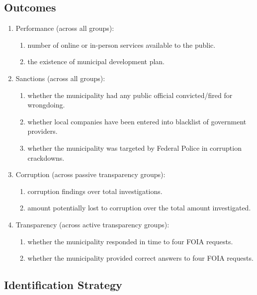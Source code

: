 \documentclass[]{article}
\begin{document}
\hypertarget{outcomes}{%
\subsection{Outcomes}\label{outcomes}}

\begin{enumerate}
\item
  Performance (across all groups):

  \begin{enumerate}
  \item
    number of online or in-person services available to the public.
  \item
    the existence of municipal development plan.
  \end{enumerate}
\item
  Sanctions (across all groups):

  \begin{enumerate}
  \item
    whether the municipality had any public official convicted/fired for
    wrongdoing.
  \item
    whether local companies have been entered into blacklist of
    government providers.
  \item
    whether the municipality was targeted by Federal Police in
    corruption crackdowns.
  \end{enumerate}
\item
  Corruption (across passive transparency groups):

  \begin{enumerate}
  \item
    corruption findings over total investigations.
  \item
    amount potentially lost to corruption over the total amount
    investigated.
  \end{enumerate}
\item
  Transparency (across active transparency groups):

  \begin{enumerate}
  \item
    whether the municipality responded in time to four FOIA requests.
  \item
    whether the municipality provided correct answers to four FOIA
    requests.
  \end{enumerate}
\end{enumerate}

\hypertarget{identification-strategy}{%
\subsection{Identification Strategy}\label{identification-strategy}}
\end{document}
